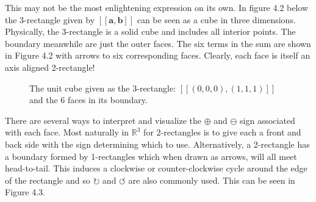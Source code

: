 This may not be the most enlightening expression on its own.
In figure 4.2 below the 3-rectangle given by $[\![\boldsymbol{a}, \boldsymbol{b}]\!]$ can be seen as a cube in three dimensions.
Physically, the 3-rectangle is a solid cube and includes all interior points.
The boundary meanwhile are just the outer faces.
The six terms in the sum are shown in Figure 4.2 with arrows to six corresponding faces.
Clearly, each face is itself an axis aligned 2-rectangle!

\begin{figure}[h]
\caption[Unit cube with boundary]{The unit cube given as the 3-rectangle: $[\![(0,0,0), (1,1,1) ]\!]$ and the 6 faces in its boundary. 
}
\centering
{}
\end{figure}

There are several ways to interpret and visualize the $\oplus$ and $\ominus$ sign associated with each face.
Most naturally in $\mathbb{R}^3$ for 2-rectangles is to give each a front and back side with the sign determining which to use.
Alternatively, a 2-rectangle has a boundary formed by 1-rectangles which when drawn as arrows, will all meet head-to-tail.
This induces a clockwise or counter-clockwise cycle around the edge of the rectangle and so $\circlearrowright$ and $\circlearrowleft$ are also commonly used.
This can be seen in Figure 4.3.

